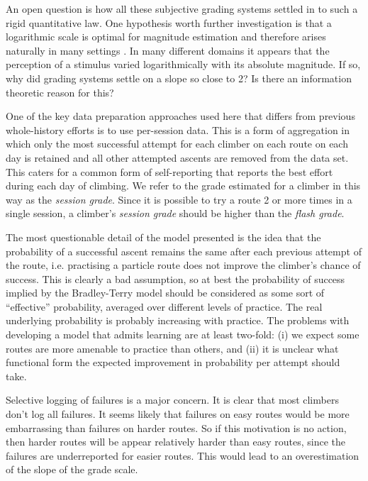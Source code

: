 \documentclass{article}
\begin{document}
An open question is how all these subjective grading systems settled in to such a rigid quantitative law. One hypothesis worth further investigation is that a logarithmic scale is optimal for magnitude estimation and therefore arises naturally in many settings \cite{portugal2011weber}. In many different domains it appears that the perception of a stimulus varied logarithmically with its absolute magnitude. If so, why did grading systems settle on a slope so close to 2? Is there an information theoretic reason for this?

One of the key data preparation approaches used here that differs from previous whole-history efforts is to use per-session data. This is a form of aggregation in which only the most successful attempt for each climber on each route on each day is retained and all other attempted ascents are removed from the data set. This caters for a common form of self-reporting that reports the best effort during each day of climbing. We refer to the grade estimated for a climber in this way as the {\it session grade}. Since it is possible to try a route 2 or more times in a single session, a climber's {\it session grade} should be higher than the {\it flash grade}. 

The most questionable detail of the model presented is the idea that the probability of a successful ascent remains the same after each previous attempt of the route, i.e. practising a particle route does not improve the climber's chance of success. This is clearly a bad assumption, so at best the probability of success implied by the Bradley-Terry model should be considered as some sort of ``effective'' probability, averaged over different levels of practice. The real underlying probability is probably increasing with practice. The problems with developing a model that admits learning are at least two-fold: (i) we expect some routes are more amenable to practice than others, and (ii) it is unclear what functional form the expected improvement in probability per attempt should take.

Selective logging of failures is a major concern. It is clear that most climbers don't log all failures. It seems likely that failures on easy routes would be more embarrassing than failures on harder routes. So if this motivation is no action, then harder routes will be appear relatively harder than easy routes, since the failures are underreported for easier routes. This would lead to an overestimation of the slope of the grade scale.
\end{document}
